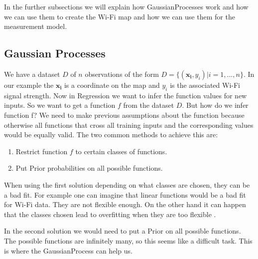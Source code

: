 In the further subsections we will explain how \Gls{GaussianProcess}es work and how we can use them to create the Wi-Fi map and how we can use them for the measurement model.

\subsection{Gaussian Processes}\label{sec:gp_basics}
We have a dataset $D$ of $n$ observations of the form $D=\{(\mathbf{x_i},y_i)|i = 1,...,n\}$. In our example the $\mathbf{x_i}$ is a coordinate on the map and $y_i$ is the associated Wi-Fi signal strength. Now in \gls{Regression} we want to infer the function values for new inputs. So we want to get a function $f$ from the dataset $D$. 
But how do we infer function f? We need to make previous assumptions about the function because otherwise all functions that cross all training inputs and the corresponding values would be equally valid. The two common methods to achieve this are: \citep[p.\ 2]{Rasmussen:2005:GPM:1162254}
\begin{enumerate}
	\setlength\itemsep{0 em}
	\item Restrict function $f$ to certain classes of functions.
	\item Put \gls{Prior} probabilities on all possible functions.
\end{enumerate}
When using the first solution depending on what classes are chosen, they can be a bad fit. For example one can imagine that linear functions would be a bad fit for Wi-Fi data. They are not flexible enough. On the other hand it can happen that the classes chosen lead to overfitting when they are too flexible \citep[p.\ 2]{Rasmussen:2005:GPM:1162254}.

In the second solution we would need to put a \gls{Prior} on all possible functions. The possible functions are infinitely many, so this seems like a difficult task. This is where the \Gls{GaussianProcess} can help us. 

